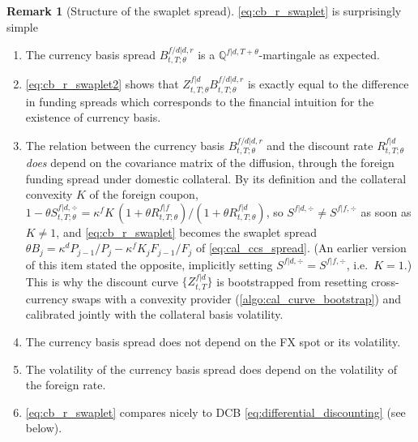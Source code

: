 \documentclass[11pt,english]{amsart}
\newcommand{\QQ}{\mathbb{Q}}
\theoremstyle{definition}
\newtheorem{rema}{Remark}
\begin{document}
\begin{rema}[Structure of the swaplet spread]
\autoref{eq:cb_r_swaplet} is surprisingly simple
\begin{enumerate}
\item The currency basis spread $B^{f/d|d,r}_{t,T;\theta}$ is a $\QQ^{f|d,T+\theta}$-martingale as expected.
\item \autoref{eq:cb_r_swaplet2} shows that $Z^{f|d}_{t,T;\theta}B^{f/d|d,r}_{t,T;\theta} $ is exactly equal to the difference in funding spreads which corresponds to the financial intuition for the existence of currency basis.  
\item The relation between the currency basis $B^{f/d|d,r}_{t,T;\theta}$ and the discount rate $R^{f|d}_{t,T;\theta}$ \emph{does} depend on the covariance matrix of the diffusion, through the foreign funding spread under domestic collateral. By its definition and the collateral convexity $K$ of the foreign coupon, $1-\theta S^{f|d,\div}_{t,T;\theta} = \kappa^f K\,(1+\theta R^{f|f}_{t,T;\theta})/(1+\theta R^{f|d}_{t,T;\theta})$, so $S^{f|d,\div} \neq S^{f|f,\div}$ as soon as $K \neq 1$, and \eqref{eq:cb_r_swaplet} becomes the swaplet spread $\theta B_j = \kappa^d P_{j-1}/P_j - \kappa^f K_j F_{j-1}/F_j$ of \eqref{eq:cal_ccs_spread}. (An earlier version of this item stated the opposite, implicitly setting $S^{f|d,\div} = S^{f|f,\div}$, i.e.\ $K = 1$.) This is why the discount curve $\{Z^{f|d}_{t,T}\}$ is bootstrapped from resetting cross-currency swaps with a convexity provider (\autoref{algo:cal_curve_bootstrap}) and calibrated jointly with the collateral basis volatility.
\item The currency basis spread does not depend on the FX spot or its volatility.
\item The volatility of the currency basis spread does depend on the volatility of the foreign rate. 
\item \autoref{eq:cb_r_swaplet} compares nicely to DCB \autoref{eq:differential_discounting} (see below). \end{enumerate}
\end{rema}
\end{document}
